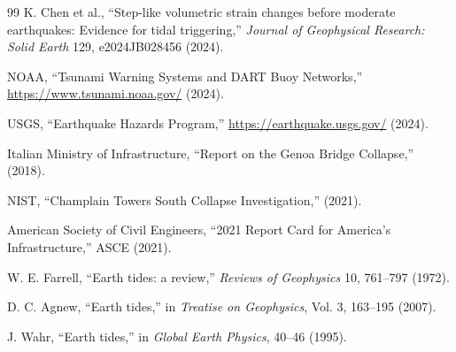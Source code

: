 \documentclass[12pt,a4paper]{article}
\theoremstyle{remark}
\begin{document}
\begin{thebibliography}{99}
		K. Chen et al., ``Step-like volumetric strain changes before moderate earthquakes: Evidence for tidal triggering,'' \emph{Journal of Geophysical Research: Solid Earth} 129, e2024JB028456 (2024).
		
		NOAA, ``Tsunami Warning Systems and DART Buoy Networks,'' \url{https://www.tsunami.noaa.gov/} (2024).
		
		USGS, ``Earthquake Hazards Program,'' \url{https://earthquake.usgs.gov/} (2024).
		
		Italian Ministry of Infrastructure, ``Report on the Genoa Bridge Collapse,'' (2018).
		
		NIST, ``Champlain Towers South Collapse Investigation,'' (2021).
		
		American Society of Civil Engineers, ``2021 Report Card for America's Infrastructure,'' ASCE (2021).
		
		W. E. Farrell, ``Earth tides: a review,'' \emph{Reviews of Geophysics} 10, 761–797 (1972).
		
		D. C. Agnew, ``Earth tides,'' in \emph{Treatise on Geophysics}, Vol. 3, 163–195 (2007).
		
		J. Wahr, ``Earth tides,'' in \emph{Global Earth Physics}, 40–46 (1995).
		
	\end{thebibliography}	
\end{document}
